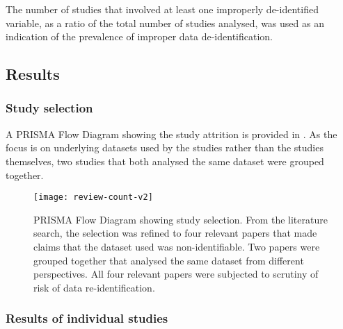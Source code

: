 The number of studies that involved at least one improperly de-identified variable, as a ratio of the total number of studies analysed, was used as an indication of the prevalence of improper data de-identification.


\subsection{Results}

\subsubsection{Study selection}

A PRISMA Flow Diagram \cite{Moher2009} showing the study attrition is provided in . As the focus is on underlying datasets used by the studies rather than the studies themselves, two studies \cite{Robertson2015, Woods2015} that both analysed the same dataset were grouped together.

\begin{figure}[!htb]
  \centering
  \texttt{[image: review-count-v2]}
  \caption{PRISMA Flow Diagram \cite{Moher2009} showing study selection. From the literature search, the selection was refined to four relevant papers that made claims that the dataset used was non-identifiable. Two papers were grouped together that analysed the same dataset from different perspectives. All four relevant papers were subjected to scrutiny of risk of data re-identification.}
  \label{fig:prisma-review}
\end{figure}

\subsubsection{Results of individual studies}

